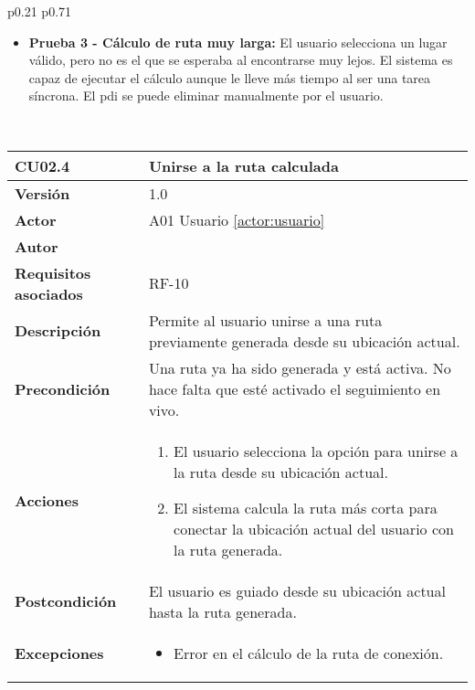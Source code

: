 \begin{table}[H]
\begin{tabularx}{\linewidth}{ p{0.21\columnwidth} p{0.71\columnwidth} }
\begin{itemize}
			\vspace{2pt}
			\item \textbf{Prueba 3 - Cálculo de ruta muy larga:} El usuario selecciona un lugar válido, pero no es el que se esperaba al encontrarse muy lejos. El sistema es capaz de ejecutar el cálculo aunque le lleve más tiempo al ser una tarea síncrona. El \acrshort{pdi} se puede eliminar manualmente por el usuario.
		\end{itemize} \\
		\bottomrule
	\end{tabularx}
	\caption{CU02.3 Añadir \acrfull{pdi}}
	\label{cu:añadir-pdi}
\end{table}


\begin{table}[H]
	\centering
	\begin{tabularx}{\linewidth}{ p{} p{} }
		\toprule
		\textbf{CU02.4}    & \textbf{Unirse a la ruta calculada} \\
		\toprule
		\textbf{Versión}              & 1.0    \\
		\textbf{Actor}                & A01 Usuario \ref{actor:usuario} \\
		\textbf{Autor}                & \autor \\
		\textbf{Requisitos asociados} & RF-10 \\
		\textbf{Descripción}          & Permite al usuario unirse a una ruta previamente generada desde su ubicación actual. \\
		\textbf{Precondición}         & Una ruta ya ha sido generada y está activa. No hace falta que esté activado el seguimiento en vivo. \\
		\textbf{Acciones}             &
		\begin{enumerate}
			\def\labelenumi{\arabic{enumi}.}
			\tightlist
			\item El usuario selecciona la opción para unirse a la ruta desde su ubicación actual.
			\item El sistema calcula la ruta más corta para conectar la ubicación actual del usuario con la ruta generada.
		\end{enumerate}\\
		\textbf{Postcondición}        & El usuario es guiado desde su ubicación actual hasta la ruta generada. \\
		\textbf{Excepciones}          & 
		\begin{itemize}
			\tightlist
			\item Error en el cálculo de la ruta de conexión.

\end{itemize}
\end{tabularx}
\end{table}

